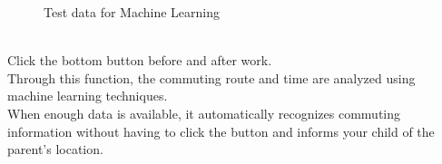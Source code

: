 \documentclass[conference]{IEEEtran}
\begin{document}
\begin{enumerate}
\begin{figure}[htbp]
    \caption{Test data for Machine Learning }
    \end{figure}\\
    Click the bottom button before and after work.\\
    Through this function, the commuting route and time are analyzed using machine learning techniques.\\
    When enough data is available, it automatically recognizes commuting information without having to click the button and informs your child of the parent's location.

\end{enumerate}
\end{document}
